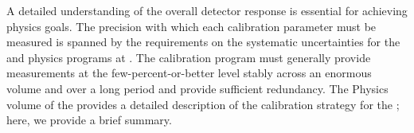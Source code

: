 


\label{sec:sp-calib-ov-intro}


A detailed understanding of the overall detector response is essential for achieving  physics goals. The precision with which each calibration parameter must be measured is spanned by the requirements on the %
systematic uncertainties for the  %
and  physics programs at . The calibration 
program 
must generally provide measurements at the few-percent-or-better 
level stably across an enormous volume and over a long period and provide sufficient redundancy. The Physics volume of the  provides a detailed description of the calibration strategy for the  ; here, we provide a brief summary.

